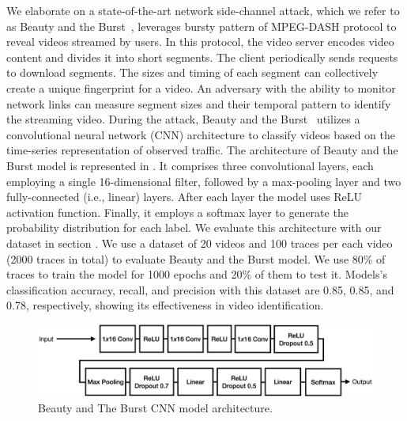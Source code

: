 We elaborate on a state-of-the-art network side-channel attack, which we refer to as Beauty and the Burst~\cite{schuster2017beautyburst}, leverages bursty pattern of MPEG-DASH protocol to reveal videos streamed by users. 
In this protocol, the video server encodes video content and divides it into short segments.
The client periodically sends requests to download segments.
The sizes and timing of each segment can collectively create a unique fingerprint for a video.
An adversary with the ability to monitor network links can measure segment sizes and their temporal pattern to identify the streaming video.
During the attack, Beauty and the Burst~\cite{schuster2017beautyburst} utilizes a convolutional neural network (CNN) architecture to classify videos based on the time-series representation of observed traffic.
The architecture of Beauty and the Burst model is represented in . 
It comprises three convolutional layers, each employing a single 16-dimensional filter, followed by a max-pooling layer and two fully-connected (i.e., linear) layers.
After each layer the model uses ReLU activation function.
Finally,  it employs a softmax layer to generate the probability distribution for each label.
We evaluate this architecture with our dataset in section .
We use a dataset of 20 videos and 100 traces per each video (2000 traces in total) to evaluate Beauty and the Burst model. 
We use 80\% of traces to train the model for 1000 epochs and 20\% of them to test it. 
Models’s classification accuracy, recall, and precision with this dataset are 0.85, 0.85, and 0.78, respectively, showing its effectiveness in video identification.
\begin{figure}[t]
  \centering
  \includegraphics[width=\columnwidth]{figures/BandB_arch.pdf}
  \caption{Beauty and The Burst CNN model architecture.}
  \label{fig:bandb-arch}
\end{figure}

